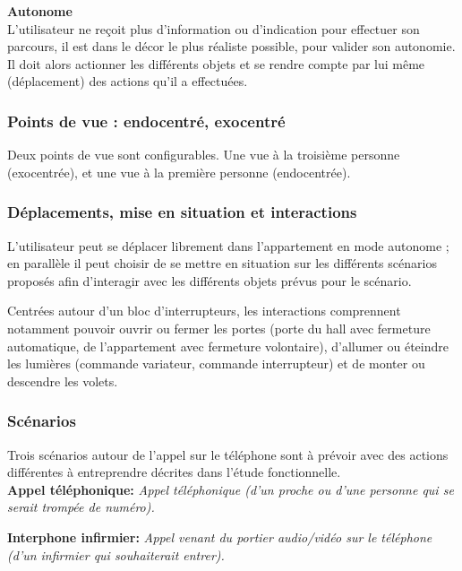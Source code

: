 \textbf{Autonome}
\\

L'utilisateur ne reçoit plus d'information ou d'indication pour effectuer son parcours, il est dans le décor le plus réaliste possible, pour valider son autonomie. Il doit alors actionner les différents objets et se rendre compte par lui même (déplacement) des actions qu'il a effectuées.

\subsubsection{Points de vue : endocentré, exocentré}

Deux points de vue sont configurables. Une vue à la troisième personne (exocentrée), et une vue à la première personne (endocentrée).

\subsubsection{Déplacements, mise en situation et interactions}

L'utilisateur peut se déplacer librement dans l'appartement en mode autonome ; en parallèle il peut choisir de se mettre en situation sur les différents scénarios proposés afin d'interagir avec les différents objets prévus pour le scénario.

Centrées autour d'un bloc d'interrupteurs, les interactions comprennent notamment pouvoir ouvrir ou fermer les portes (porte du hall avec fermeture automatique, de l'appartement avec fermeture volontaire), d'allumer ou éteindre les lumières (commande variateur, commande interrupteur) et de monter ou descendre les volets.

\subsubsection{Scénarios}
Trois scénarios autour de l'appel sur le téléphone sont à prévoir avec des actions différentes à entreprendre décrites dans l'étude fonctionnelle. \\

\textbf{Appel téléphonique: }\textit{Appel téléphonique (d'un proche ou d'une personne qui se serait trompée de numéro). }

\textbf{Interphone infirmier: } \textit{Appel venant du portier audio/vidéo sur le téléphone (d'un infirmier qui souhaiterait entrer). }

